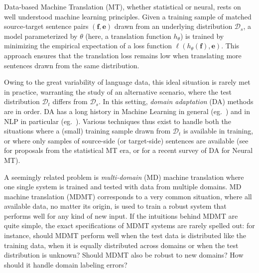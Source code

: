 \documentclass[11pt,a4paper]{article}
\newcommand{\fyDone}[1]{\done[FY]\Todo[FY:]{\textcolor{orange}{#1}}}
\newcommand{\jcDone}[1]{\done[JC]\Todo[JC:]{\textcolor{red}{#1}}}
\newcommand{\src}{\ensuremath{\mathbf{f}}} %
\newcommand{\trg}{\ensuremath{\mathbf{e}}} %
\begin{document}
Data-based Machine Translation (MT), whether statistical or neural, rests on well understood machine learning principles. Given a training sample of matched source-target sentence pairs $(\src,\trg)$\jcDone{shoulnt trg be e as below ?} drawn from an underlying distribution $\mathcal{D}_s$, a model parameterized by $\theta$ (here, a translation function $h_{\theta}$) is trained by minimizing the empirical expectation of a loss function $\ell(h_\theta(\src), \trg)$. This approach ensures that the translation loss remains low when translating more sentences drawn from the same distribution.

Owing to the great variability of language data, this ideal situation is rarely met in practice, warranting the study of an alternative scenario, where the test distribution $\mathcal{D}_t$ differs from $\mathcal{D}_s$. In this setting, \emph{domain adaptation} (DA) methods are in order. DA has a long history in Machine Learning in general (eg.\ \cite{Shimodaira00improving,Ben-David09atheory,Quinonero08dataset,Pan10asurvey})\fyDone{cite non covariate shift} and in NLP in particular (eg.\ \cite{Daume06domain,Blitzer07domain,Jiang07instance}). Various techniques thus exist to handle both the situations where a (small) training sample drawn from $\mathcal{D}_t$ is available in training, or where only samples of source-side (or target-side) sentences are available (see \cite{Foster07mixture,Bertoldi09domain,Axelrod11domain} for proposals from the statistical MT era, or \cite{Chu18asurvey} for a recent survey of DA for Neural MT).

A seemingly related problem is \emph{multi-domain} (MD) machine translation \cite{Sajjad17neural,Farajian17multidomain,Kobus17domaincontrol,Zeng18multidomain,Pham19generic} where one single system is trained and tested with data from multiple domains. MD machine translation (MDMT) corresponds to a very common situation, where all available data, no matter its origin, is used to train a robust system that performs well for any kind of new input.
If the intuitions behind MDMT are quite simple, the exact specifications of MDMT systems are rarely spelled out: for instance, should MDMT perform well when the test data is distributed like the training data, when it is equally distributed across domains or when the test distribution is unknown? Should MDMT also be robust to new domains? How should it handle domain labeling errors? %
\end{document}
